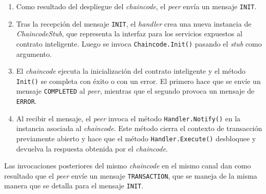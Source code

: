 \begin{enumerate}
\item Como resultado del despliegue del \textit{chaincode}, el \textit{peer} envía un mensaje \texttt{INIT}. 


\item Tras la recepción del mensaje \texttt{INIT}, el \textit{handler} crea una nueva instancia de \textit{ChaincodeStub}, que representa la interfaz para los servicios expuestos al contrato inteligente. Luego se invoca \texttt{Chaincode.Init()} pasando el \textit{stub} como argumento.

\item El \textit{chaincode} ejecuta la inicialización del contrato inteligente y el método \texttt{Init()} se completa con éxito o con un error. El primero hace que se envíe un mensaje \texttt{COMPLETED} al \textit{peer}, mientras que el segundo provoca un mensaje de \texttt{ERROR}.

\item Al recibir el mensaje, el \textit{peer} invoca el método \texttt{Handler.Notify()} en la instancia asociada al \textit{chaincode}. Este método cierra el contexto de transacción previamente abierto y hace que el método \texttt{Handler.Execute()} desbloquee y devuelva la respuesta obtenida por el \textit{chaincode}.

\end{enumerate}

Las invocaciones posteriores del mismo \textit{chaincode} en el mismo canal dan como resultado que el \textit{peer} envíe un mensaje \texttt{TRANSACTION}, que se maneja de la misma manera que se detalla para el mensaje \texttt{INIT}.



